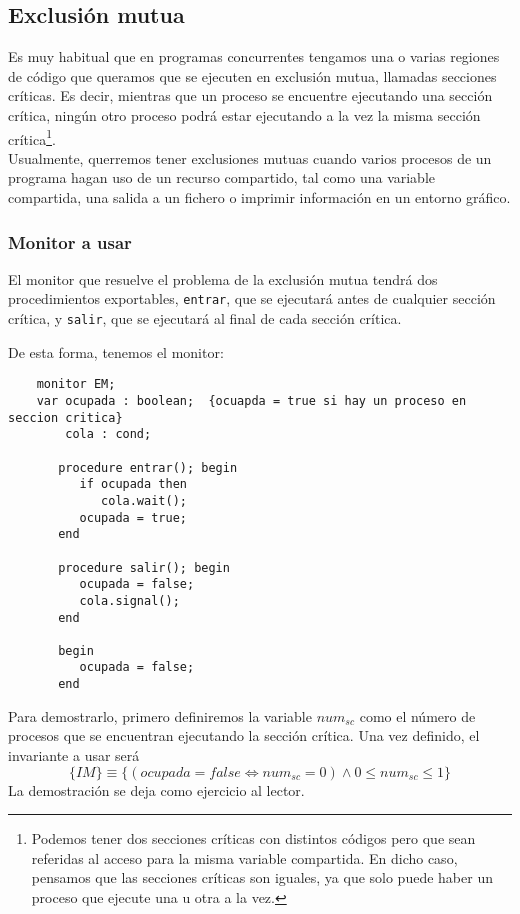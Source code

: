 \subsection{Exclusión mutua}
Es muy habitual que en programas concurrentes tengamos una o varias regiones de código que queramos que se ejecuten en exclusión mutua, llamadas secciones críticas. Es decir, mientras que un proceso se encuentre ejecutando una sección crítica, ningún otro proceso podrá estar ejecutando a la vez la misma sección crítica\footnote{Podemos tener dos secciones críticas con distintos códigos pero que sean referidas al acceso para la misma variable compartida. En dicho caso, pensamos que las secciones críticas son iguales, ya que solo puede haber un proceso que ejecute una u otra a la vez.}.\\

Usualmente, querremos tener exclusiones mutuas cuando varios procesos de un programa hagan uso de un recurso compartido, tal como una variable compartida, una salida a un fichero o imprimir información en un entorno gráfico.

\subsubsection{Monitor a usar}
El monitor que resuelve el problema de la exclusión mutua tendrá dos procedimientos exportables, \verb|entrar|, que se ejecutará antes de cualquier sección crítica, y \verb|salir|, que se ejecutará al final de cada sección crítica.

De esta forma, tenemos el monitor:
\begin{verbatim}
    monitor EM;
    var ocupada : boolean;  {ocuapda = true si hay un proceso en seccion critica}
        cola : cond;

       procedure entrar(); begin
          if ocupada then
             cola.wait();
          ocupada = true;
       end

       procedure salir(); begin
          ocupada = false;
          cola.signal();
       end

       begin
          ocupada = false;
       end
\end{verbatim}
Para demostrarlo, primero definiremos la variable $num_{sc}$ como el número de procesos que se encuentran ejecutando la sección crítica. Una vez definido, el invariante a usar será
\begin{equation*}
    \{IM\} \equiv \{(ocupada = false \Longleftrightarrow num_{sc} = 0) \land 0\leq num_{sc} \leq 1\}
\end{equation*}
La demostración se deja como ejercicio al lector.

